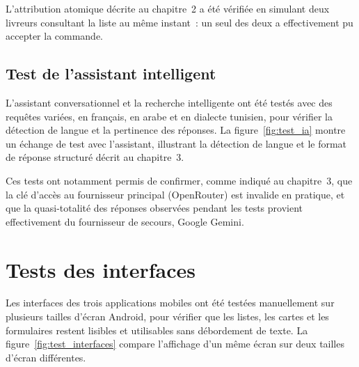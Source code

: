 \documentclass[12pt,fleqn,a4paper]{report}
\begin{document}
\begin{justify}
L'attribution atomique décrite au chapitre~2 a été vérifiée en simulant deux livreurs consultant la liste au même instant~: un seul des deux a effectivement pu accepter la commande.

\subsection{Test de l'assistant intelligent}

L'assistant conversationnel et la recherche intelligente ont été testés avec des requêtes variées, en français, en arabe et en dialecte tunisien, pour vérifier la détection de langue et la pertinence des réponses. La figure~\ref{fig:test_ia} montre un échange de test avec l'assistant, illustrant la détection de langue et le format de réponse structuré décrit au chapitre~3.


Ces tests ont notamment permis de confirmer, comme indiqué au chapitre~3, que la clé d'accès au fournisseur principal (OpenRouter) est invalide en pratique, et que la quasi-totalité des réponses observées pendant les tests provient effectivement du fournisseur de secours, Google Gemini.

\section{Tests des interfaces}

Les interfaces des trois applications mobiles ont été testées manuellement sur plusieurs tailles d'écran Android, pour vérifier que les listes, les cartes et les formulaires restent lisibles et utilisables sans débordement de texte. La figure~\ref{fig:test_interfaces} compare l'affichage d'un même écran sur deux tailles d'écran différentes.



\end{justify}
\end{document}
